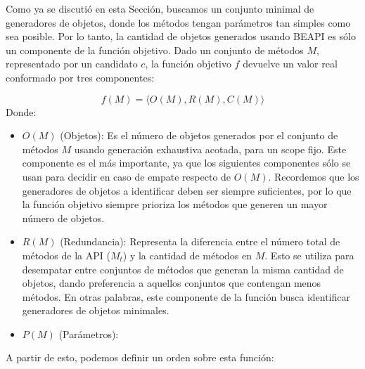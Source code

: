 Como ya se discutió en esta Sección, buscamos un conjunto minimal de generadores de objetos, donde los métodos tengan parámetros tan simples como sea posible. Por lo tanto, la cantidad de objetos generados usando BEAPI es sólo un componente de la función objetivo. Dado un conjunto de métodos $M$, representado por un candidato $c$, la función objetivo $f$ devuelve un valor real conformado por tres componentes:

\[
f(M) = \langle O(M), R(M), C(M) \rangle
\]
Donde:

\begin{itemize}
    \item $O(M)$ (Objetos): Es el número de objetos generados por el conjunto de métodos $M$ usando generación exhaustiva acotada, para un scope fijo. Este componente es el más importante, ya que los siguientes componentes sólo se usan para decidir en caso de empate respecto de $O(M)$. Recordemos que los generadores de objetos a identificar deben ser siempre suficientes, por lo que la función objetivo siempre prioriza los métodos que generen un mayor número de objetos.
    \item $R(M)$ (Redundancia): Representa la diferencia entre el número total de métodos de la API ($M_t$) y la cantidad de métodos en $M$. Esto se utiliza para desempatar entre conjuntos de métodos que generan la misma cantidad de objetos, dando preferencia a aquellos conjuntos que contengan menos métodos. En otras palabras, este componente de la función busca identificar generadores de objetos minimales.
    \item $P(M)$ (Parámetros): 
\end{itemize}


A partir de esto, podemos definir un orden sobre esta función: 

